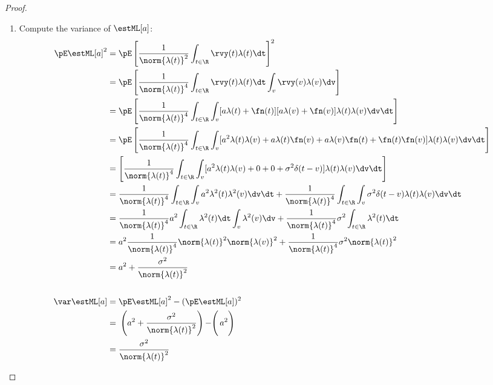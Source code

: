 \begin{proof}
\begin{enumerate}
\item Compute the variance of $\estML[a]$:
\begin{align*}
  \pE \estML[a]^2
    &= \pE \left[ \frac{1}{\norm{\lambda(t)}^2} \int_{t\in\R} \rvy(t)\lambda(t) \dt\right]^2
  \\&= \pE \left[  \frac{1}{\norm{\lambda(t)}^4}
        \int_{t\in\R} \rvy(t)\lambda(t) \dt \int_v \rvy(v)\lambda(v) \dv
        \right]
  \\&= \pE \left[  \frac{1}{\norm{\lambda(t)}^4}
        \int_{t\in\R} \int_v [a\lambda(t) + \fn(t)][a\lambda(v) + \fn(v)]
        \lambda(t) \lambda(v)
        \dv\dt \right]
  \\&= \pE \left[  \frac{1}{\norm{\lambda(t)}^4}
        \int_{t\in\R} \int_v
        [a^2\lambda(t)\lambda(v) + a\lambda(t)\fn(v) + a\lambda(v)\fn(t) + \fn(t)\fn(v)]
        \lambda(t) \lambda(v)
        \dv\dt \right]
  \\&= \left[  \frac{1}{\norm{\lambda(t)}^4}
        \int_{t\in\R} \int_v
        [a^2\lambda(t)\lambda(v) + 0 + 0 + \sigma^2\delta(t-v)]
        \lambda(t) \lambda(v)
        \dv\dt \right]
  \\&= \frac{1}{\norm{\lambda(t)}^4}
        \int_{t\in\R} \int_v a^2\lambda^2(t)\lambda^2(v) \dv\dt +
        \frac{1}{\norm{\lambda(t)}^4}
        \int_{t\in\R} \int_v \sigma^2\delta(t-v) \lambda(t) \lambda(v) \dv\dt
  \\&= \frac{1}{\norm{\lambda(t)}^4}
        a^2 \int_{t\in\R} \lambda^2(t) \dt \int_v \lambda^2(v) \dv +
        \frac{1}{\norm{\lambda(t)}^4}
        \sigma^2\int_{t\in\R} \lambda^2(t) \dt
  \\&= a^2 \frac{1}{\norm{\lambda(t)}^4}
        \norm{\lambda(t)}^2 \norm{\lambda(v)}^2 +
        \frac{1}{\norm{\lambda(t)}^4}
        \sigma^2 \norm{\lambda(t)}^2
  \\&= a^2 + \frac{\sigma^2}{\norm{\lambda(t)}^2}
\\
\\
  \var\estML[a]
    &= \pE \estML[a]^2 - (\pE \estML[a])^2
  \\&= \left.\left.\left(a^2 + \frac{\sigma^2}{\norm{\lambda(t)}^2}\right) - \right( a^2 \right)
  \\&= \frac{\sigma^2}{\norm{\lambda(t)}^2}
\end{align*}


\end{enumerate}
\end{proof}
